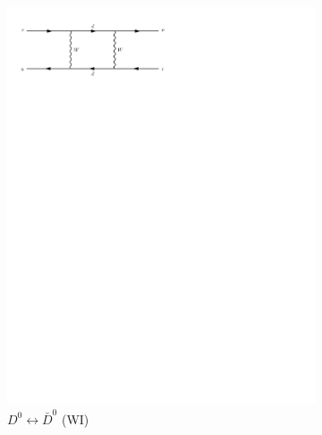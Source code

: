 \documentclass[11pt,a4paper]{article}
\begin{document}
\begin{figure}[h]
	\centering
	\begin{subfigure}[h]{0.3\textwidth}
		\includegraphics[trim={0.5cm 22cm 10cm 0cm},width=\textwidth]{../Diagrams/D19.pdf}
		\caption{$D^0\longleftrightarrow \bar{D}^0$ (WI)}
		\label{fey:19}
	\end{subfigure}
	~
	\begin{subfigure}[h]{0.3\textwidth}

\end{subfigure}
\end{figure}
\end{document}
